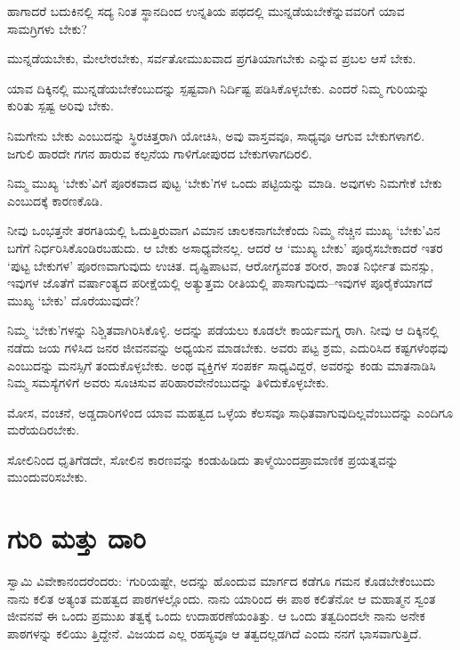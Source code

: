 
ಹಾಗಾದರೆ ಬದುಕಿನಲ್ಲಿ ಸದ್ಯ ನಿಂತ ಸ್ಥಾನದಿಂದ ಉನ್ನತಿಯ ಪಥದಲ್ಲಿ ಮುನ್ನಡೆಯಬೇಕೆನ್ನು\-ವವರಿಗೆ ಯಾವ ಸಾಮಗ್ರಿಗಳು ಬೇಕು?

ಮುನ್ನಡೆಯಬೇಕು, ಮೇಲೇರಬೇಕು, ಸರ್ವತೋಮುಖವಾದ ಪ್ರಗತಿಯಾಗಬೇಕು ಎನ್ನುವ ಪ್ರಬಲ ಆಸೆ ಬೇಕು.

ಯಾವ ದಿಕ್ಕಿನಲ್ಲಿ ಮುನ್ನಡೆಯಬೇಕೆಂಬುದನ್ನು ಸ್ಪಷ್ಟವಾಗಿ ನಿರ್ದಿಷ್ಟ ಪಡಿಸಿಕೊಳ್ಳಬೇಕು. ಎಂದರೆ ನಿಮ್ಮ ಗುರಿಯನ್ನು ಕುರಿತು ಸ್ಪಷ್ಟ ಅರಿವು ಬೇಕು.

ನಿಮಗೇನು ಬೇಕು ಎಂಬುದನ್ನು ಸ್ಥಿರಚಿತ್ತರಾಗಿ ಯೋಚಿಸಿ, ಅವು ವಾಸ್ತವವೂ, ಸಾಧ್ಯವೂ ಆಗುವ ಬೇಕುಗಳಾಗಲಿ. ಜಗುಲಿ ಹಾರದೇ ಗಗನ ಹಾರುವ ಕಲ್ಪನೆಯ ಗಾಳಿಗೋಪುರದ ಬೇಕುಗಳಾಗದಿರಲಿ.

ನಿಮ್ಮ ಮುಖ್ಯ ‘ಬೇಕು’ವಿಗೆ ಪೂರಕವಾದ ಪುಟ್ಟ ‘ಬೇಕು’ಗಳ ಒಂದು ಪಟ್ಟಿಯನ್ನು ಮಾಡಿ. ಅವುಗಳು ನಿಮಗೇಕೆ ಬೇಕು ಎಂಬುದಕ್ಕೆ ಕಾರಣಕೊಡಿ.

ನೀವು ಒಂಭತ್ತನೇ ತರಗತಿಯಲ್ಲಿ ಓದುತ್ತಿರುವಾಗ ವಿಮಾನ ಚಾಲಕನಾಗಬೇಕೆಂದು ನಿಮ್ಮ ನೆಚ್ಚಿನ ಮುಖ್ಯ ‘ಬೇಕು’ವಿನ ಬಗೆಗೆ ನಿರ್ಧರಿಸಿಕೊಂಡಿರಬಹುದು. ಆ ಬೇಕು ಅಸಾಧ್ಯವೇನಲ್ಲ. ಆದರೆ ಆ ‘ಮುಖ್ಯ ಬೇಕು’ ಪೂರೈಸಬೇಕಾದರೆ ಇತರ ‘ಪುಟ್ಟ ಬೇಕುಗಳ’ ಪೂರಣವಾಗುವುದು ಉಚಿತ. ದೃಷ್ಟಿಪಾಟವ, ಆರೋಗ್ಯವಂತ ಶರೀರ, ಶಾಂತ ನಿರ್ಭೀತ ಮನಸ್ಸು, ಇವುಗಳ ಜೊತೆಗೆ ವರ್ಷಾಂತ್ಯದ ಪರೀಕ್ಷೆಯಲ್ಲಿ ಅತ್ಯುತ್ತಮ ರೀತಿಯಲ್ಲಿ ಪಾಸಾಗುವುದು–ಇವುಗಳ ಪೂರೈಕೆಯಾಗದೆ ಮುಖ್ಯ ‘ಬೇಕು’ ದೊರೆಯುವುದೇ?

ನಿಮ್ಮ ‘ಬೇಕು’ಗಳನ್ನು ನಿಶ್ಚಿತವಾಗಿರಿಸಿಕೊಳ್ಳಿ. ಅದನ್ನು ಪಡೆಯಲು ಕೂಡಲೇ ಕಾರ್ಯಮಗ್ನ ರಾಗಿ. ನೀವು ಆ ದಿಕ್ಕಿನಲ್ಲಿ ನಡೆದು ಜಯ ಗಳಿಸಿದ ಜನರ ಜೀವನವನ್ನು ಅಧ್ಯಯನ ಮಾಡಬೇಕು. ಅವರು ಪಟ್ಟ ಶ್ರಮ, ಎದುರಿಸಿದ ಕಷ್ಟಗಳೆಂಥವು ಎಂಬುದನ್ನು ಮನಸ್ಸಿಗೆ ತಂದುಕೊಳ್ಳಬೇಕು. ಅಂಥ ವ್ಯಕ್ತಿಗಳ ಸಂಪರ್ಕ ಸಾಧ್ಯವಿದ್ದರೆ, ಅವರನ್ನು ಕಂಡು ಮಾತನಾಡಿಸಿ ನಿಮ್ಮ ಸಮಸ್ಯೆ\-ಗಳಿಗೆ ಅವರು ಸೂಚಿಸುವ ಪರಿಹಾರವೇನೆಂಬುದನ್ನು ತಿಳಿದುಕೊಳ್ಳಬೇಕು.

ಮೋಸ, ವಂಚನೆ, ಅಡ್ಡದಾರಿಗಳಿಂದ ಯಾವ ಮಹತ್ವದ ಒಳ್ಳೆಯ ಕೆಲಸವೂ ಸಾಧಿತ\-ವಾಗುವು\-ದಿಲ್ಲ\-ವೆಂಬುದನ್ನು ಎಂದಿಗೂ ಮರೆಯದಿರಬೇಕು.

ಸೋಲಿನಿಂದ ಧೃತಿಗೆಡದೇ, ಸೋಲಿನ ಕಾರಣವನ್ನು ಕಂಡುಹಿಡಿದು ತಾಳ್ಮೆಯಿಂದ\break ಪ್ರಾಮಾಣಿಕ ಪ್ರಯತ್ನವನ್ನು ಮುಂದುವರಿಸಬೇಕು.

\newpage


\section*{ಗುರಿ ಮತ್ತು ದಾರಿ}

\vskip -8pt

ಸ್ವಾಮಿ ವಿವೇಕಾನಂದರೆಂದರು: ‘ಗುರಿಯಷ್ಟೇ, ಅದನ್ನು ಹೊಂದುವ ಮಾರ್ಗದ ಕಡೆಗೂ ಗಮನ ಕೊಡಬೇಕೆಂಬುದು ನಾನು ಕಲಿತ ಅತ್ಯಂತ ಮಹತ್ವದ ಪಾಠಗಳಲ್ಲೊಂದು. ನಾನು ಯಾರಿಂದ ಈ ಪಾಠ ಕಲಿತೆನೋ ಆ ಮಹಾತ್ಮನ ಸ್ವಂತ ಜೀವನವೆ ಈ ಒಂದು ಪ್ರಮುಖ ತತ್ವಕ್ಕೆ ಒಂದು ಉದಾಹರಣೆಯಂತಿತ್ತು. ಆ ಒಂದು ತತ್ವದಿಂದಲೇ ನಾನು ಅನೇಕ ಪಾಠಗಳನ್ನು ಕಲಿಯು ತ್ತಿದ್ದೇನೆ. ವಿಜಯದ ಎಲ್ಲ ರಹಸ್ಯವೂ ಆ ತತ್ವದಲ್ಲಡಗಿದೆ ಎಂದು ನನಗೆ ಭಾಸವಾಗುತ್ತಿದೆ.

